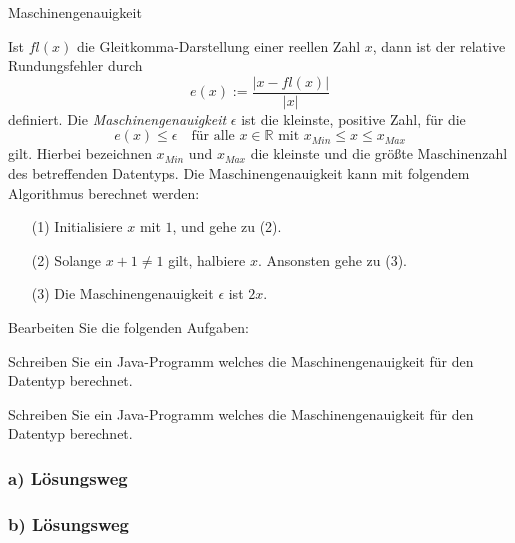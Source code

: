 \begin{frame}[t]%
\medskip


\begin{exercise}{Maschinengenauigkeit}

\begin{body}
Ist $fl(x)$ die Gleitkomma-Darstellung einer reellen Zahl $x$, dann ist der relative Rundungsfehler durch \[ e(x) := \frac{\lvert x - fl(x) \rvert }{\lvert x \rvert}  \] definiert.
Die \emph{Maschinengenauigkeit} $\epsilon$ ist die kleinste, positive Zahl, für die \[ e(x) \leq \epsilon \quad\text{für alle } x \in \mathbb{R} \text{ mit } x_{Min} \leq x \leq x_{Max} \] gilt.
Hierbei bezeichnen $x_{Min}$ und $x_{Max}$ die kleinste und die größte Maschinenzahl des betreffenden Datentyps.
Die Maschinengenauigkeit kann mit folgendem Algorithmus berechnet werden:
\begin{center}
\begin{minipage}{0.8\textwidth}
\begin{enumerate}
\item[(1)] Initialisiere $x$ mit $1$, und gehe zu (2).
\item[(2)] Solange $x + 1 \neq 1$ gilt, halbiere $x$. Ansonsten gehe zu (3).
\item[(3)] Die Maschinengenauigkeit $\epsilon$ ist $2x$.
\end{enumerate}
\end{minipage}
\end{center}
\bigskip
Bearbeiten Sie die folgenden Aufgaben:
\begin{parts}
\item Schreiben Sie ein Java-Programm welches die Maschinengenauigkeit für den Datentyp  berechnet.
\item Schreiben Sie ein Java-Programm welches die Maschinengenauigkeit für den Datentyp  berechnet.
\end{parts}
\end{body}
\end{exercise}
\end{frame}

\begin{frame}[fragile]%
 \frametitle{a) L\"osungsweg}%

\begin{center}

\end{center}
\end{frame}

\begin{frame}[fragile]%
 \frametitle{b) L\"osungsweg}%

\begin{center}

\end{center}
\end{frame}
